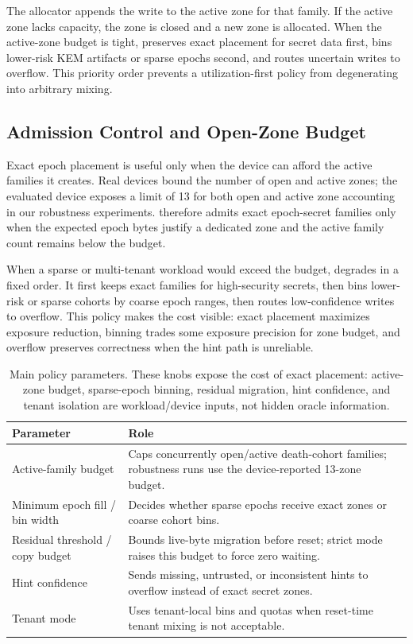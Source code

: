 The allocator appends the write to the active zone for that family.  If the active zone lacks capacity, the zone is closed and a new zone is allocated.  When the active-zone budget is tight, \system preserves exact placement for secret data first, bins lower-risk KEM artifacts or sparse epochs second, and routes uncertain writes to overflow.  This priority order prevents a utilization-first policy from degenerating into arbitrary mixing.

\subsection{Admission Control and Open-Zone Budget}

Exact epoch placement is useful only when the device can afford the active families it creates.  Real \zns devices bound the number of open and active zones; the evaluated device exposes a limit of 13 for both open and active zone accounting in our robustness experiments.  \system therefore admits exact epoch-secret families only when the expected epoch bytes justify a dedicated zone and the active family count remains below the budget.

When a sparse or multi-tenant workload would exceed the budget, \system degrades in a fixed order.  It first keeps exact families for high-security secrets, then bins lower-risk or sparse cohorts by coarse epoch ranges, then routes low-confidence writes to overflow.  This policy makes the cost visible: exact placement maximizes exposure reduction, binning trades some exposure precision for zone budget, and overflow preserves correctness when the hint path is unreliable.

\begin{table}[t]
\centering
\caption{Main \system policy parameters.  These knobs expose the cost of exact placement: active-zone budget, sparse-epoch binning, residual migration, hint confidence, and tenant isolation are workload/device inputs, not hidden oracle information.}
\label{tab:params}
\footnotesize
\begin{tabularx}{\columnwidth}{lY}
\toprule
\textbf{Parameter} & \textbf{Role} \\
\midrule
Active-family budget & Caps concurrently open/active death-cohort families; robustness runs use the device-reported 13-zone budget. \\
Minimum epoch fill / bin width & Decides whether sparse epochs receive exact zones or coarse cohort bins. \\
Residual threshold / copy budget & Bounds live-byte migration before reset; strict mode raises this budget to force zero waiting. \\
Hint confidence & Sends missing, untrusted, or inconsistent hints to overflow instead of exact secret zones. \\
Tenant mode & Uses tenant-local bins and quotas when reset-time tenant mixing is not acceptable. \\
\bottomrule
\end{tabularx}
\end{table}

